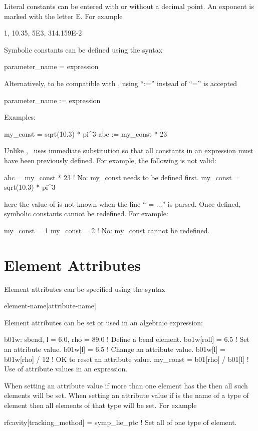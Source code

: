 Literal constants can be entered with or without a decimal point. An
exponent is marked with the letter E. For example
\begin{example}
  1, 10.35, 5E3, 314.159E-2
\end{example}
Symbolic constants can be defined using the syntax
\begin{example}
  parameter_name = expression
\end{example}
Alternatively, to be compatible with \mad, using ``:='' instead of ``='' is accepted
\begin{example}
  parameter_name := expression
\end{example}
Examples:
\begin{example}
  my_const = sqrt(10.3) * pi^3
  abc     := my_const * 23
\end{example}
Unlike \mad, \bmad\ uses immediate substitution so that all constants
in an expression must have been previously defined. For example, the
following is not valid:
\begin{example}
  abc      = my_const * 23      ! No: my_const needs to be defined first.
  my_const = sqrt(10.3) * pi^3
\end{example}
here the value of  is not known when the line ``
= $\ldots$'' is parsed. Once
defined, symbolic constants cannot be redefined. For example:
\begin{example}
  my_const = 1
  my_const = 2  ! No: my_const cannot be redefined.
\end{example}


\section{Element Attributes}

Element attributes can be specified using the syntax
\begin{example}
  element-name[attribute-name]
\end{example}
Element attributes can be set or used in an algebraic expression:
\begin{example}
  b01w: sbend, l = 6.0, rho = 89.0   ! Define a bend element.
  bo1w[roll] = 6.5                   ! Set an attribute value.
  b01w[l] = 6.5                      ! Change an attribute value.
  b01w[l] = b01w[rho] / 12           ! OK to reset an attribute value.
  my_const = b01[rho] / b01[l]       ! Use of attribute values in an expression.
\end{example}
When setting an attribute value if more than one element has the
 then all such elements will be set.  When setting an
attribute value if  is the name of a type of element
then all elements of that type will be set. For example
\begin{example}
  rfcavity[tracking_method] = symp_lie_ptc ! Set all of one type of element.
\end{example}


